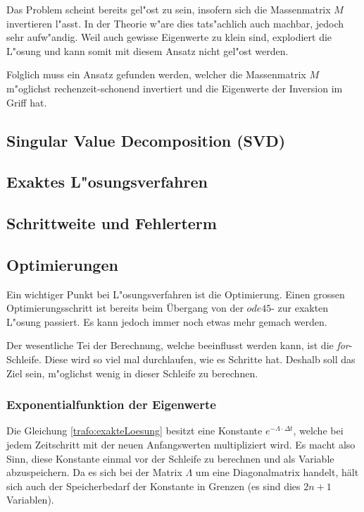 \begin{refsection}
Das Problem scheint bereits gel"ost zu sein, insofern sich die Massenmatrix $M$ invertieren l"asst. In der Theorie w"are dies tats"achlich auch machbar, jedoch sehr aufw"andig. Weil auch gewisse Eigenwerte zu klein sind, explodiert die L"osung und kann somit mit diesem Ansatz nicht gel"ost werden.

Folglich muss ein Ansatz gefunden werden, welcher die Massenmatrix $M$ m"oglichst rechenzeit-schonend invertiert und die Eigenwerte der Inversion im Griff hat. 


\subsection{Singular Value Decomposition (SVD) }

\subsection{Exaktes L"osungsverfahren}

\subsection{Schrittweite und Fehlerterm}

\subsection{Optimierungen}

Ein wichtiger Punkt bei L"osungsverfahren ist die Optimierung. Einen grossen Optimierungsschritt ist bereits beim Übergang von der $ode45$- zur exakten L"osung passiert. Es kann jedoch immer noch etwas mehr gemach werden. 

Der wesentliche Tei der Berechnung, welche beeinflusst werden kann, ist die \textit{for}-Schleife. Diese wird so viel mal durchlaufen, wie es Schritte hat. Deshalb soll das Ziel sein, m"oglichst wenig in dieser Schleife zu berechnen. 

\subsubsection{Exponentialfunktion der Eigenwerte}
Die Gleichung \ref{trafo:exakteLoesung} besitzt eine Konstante $e^{-\Lambda \cdot \Delta t}$, welche bei jedem Zeitschritt mit der neuen Anfangswerten multipliziert wird. Es macht also Sinn, diese Konstante einmal vor der Schleife zu berechnen und als Variable abzuspeichern. Da es sich bei der Matrix $\Lambda$ um eine Diagonalmatrix handelt, hält sich auch der Speicherbedarf der Konstante in Grenzen (es sind dies $2n + 1$ Variablen). 


\end{refsection}
